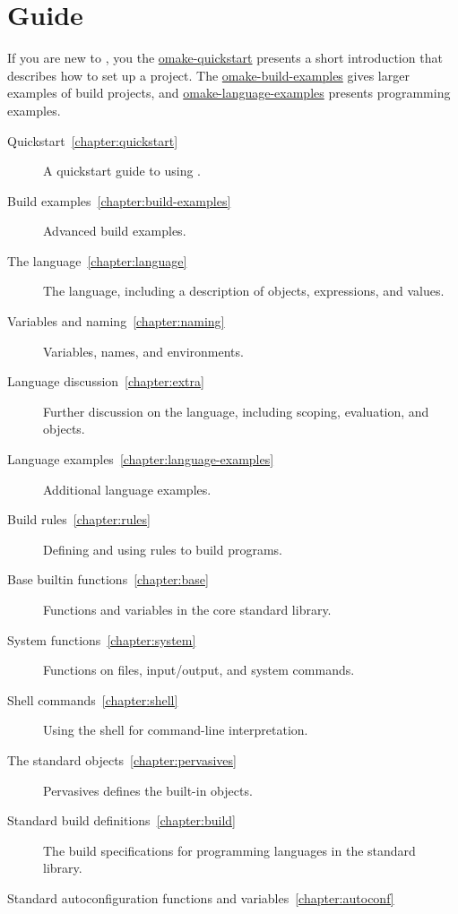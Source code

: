 %
\chapter{Guide}
\label{chapter:omake}
\label{section:guide}

If you are new to \OMake{}, you the \href{omake-quickstart.html}{omake-quickstart} presents a short
introduction that describes how to set up a project.  The
\href{omake-build-examples.html}{omake-build-examples} gives larger examples of build projects, and
\href{omake-language-examples.html}{omake-language-examples} presents programming examples.

\begin{description}
\item[Quickstart~\ref{chapter:quickstart}]
%
   A quickstart guide to using .
\item[Build examples~\ref{chapter:build-examples}]
%
   Advanced build examples.
\item[The \OMake{} language~\ref{chapter:language}]
%
   The  language, including a description of objects, expressions, and values.
\item[Variables and naming~\ref{chapter:naming}]
%
   Variables, names, and environments.
\item[Language discussion~\ref{chapter:extra}]
%
   Further discussion on the language, including scoping, evaluation, and objects.
\item[Language examples~\ref{chapter:language-examples}]
%
   Additional language examples.
\item[Build rules~\ref{chapter:rules}]
%
   Defining and using rules to build programs.
\item[Base builtin functions~\ref{chapter:base}]
%
   Functions and variables in the core standard library.
\item[System functions~\ref{chapter:system}]
%
   Functions on files, input/output, and system commands.
\item[Shell commands~\ref{chapter:shell}]
%
   Using the  shell for command-line interpretation.
\item[The standard objects~\ref{chapter:pervasives}]
%
   Pervasives defines the built-in objects.
\item[Standard build definitions~\ref{chapter:build}]
%
   The build specifications for programming languages in the \OMake{} standard library.
\item[Standard autoconfiguration functions and variables~\ref{chapter:autoconf}]

\end{description}
